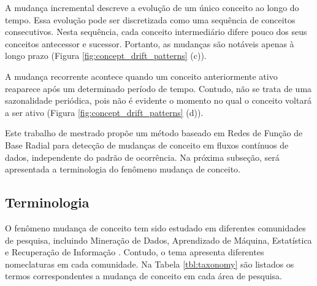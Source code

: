 \documentclass[msc, classic, a4paper]{ufbathesis}
\begin{document}
A mudança incremental descreve a evolução de um único conceito ao longo do tempo.
Essa evolução pode ser discretizada como uma sequência de conceitos consecutivos.
Nesta sequência, cada conceito intermediário difere pouco dos seus conceitos antecessor e sucessor.
Portanto, as mudanças são notáveis apenas à longo prazo (Figura \ref{fig:concept_drift_patterns} (c)).

A mudança recorrente acontece quando um conceito anteriormente ativo reaparece após um determinado período de tempo.
Contudo, não se trata de uma sazonalidade periódica, pois não é evidente o momento no qual o conceito voltará a ser ativo (Figura \ref{fig:concept_drift_patterns} (d)).

Este trabalho de mestrado propõe um método baseado em Redes de Função de Base Radial para detecção de mudanças de conceito em fluxos contínuos de dados, independente do padrão de ocorrência.
Na próxima subseção, será apresentada a terminologia do fenômeno mudança de conceito.

\subsection{Terminologia}

O fenômeno mudança de conceito tem sido estudado em diferentes comunidades de pesquisa, incluindo Mineração de Dados,
Aprendizado de Máquina, Estatística e Recuperação de Informação \cite{Zliobaite:2010}.
Contudo, o tema apresenta diferentes nomeclaturas em cada comunidade.
Na Tabela \ref{tbl:taxonomy} são listados os termos correspondentes a mudança de conceito em cada área de pesquisa.

\begin{table}[!ht]
    \caption{Terminologia - Mudança de Conceito \cite{Zliobaite:2010}}
    \label{tbl:taxonomy}
    \centering
\end{table}
\end{document}
